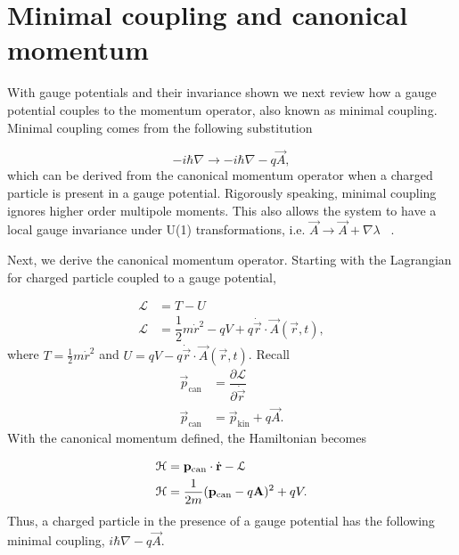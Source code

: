 \section{Minimal coupling and canonical momentum}
With gauge potentials and their invariance shown we next review how a gauge potential couples to the momentum operator, also known as minimal coupling.
Minimal coupling comes from the following substitution

\begin{equation}
  -i\hbar\nabla \rightarrow -i\hbar\nabla - q\vec{A},
\end{equation}
which can be derived from the canonical momentum operator when a charged particle is present in a gauge potential.
Rigorously speaking, minimal coupling ignores higher order multipole moments.
This also allows the system to have a local gauge invariance under U(1) transformations, i.e.
$\vec{A} \rightarrow \vec{A} + \nabla\lambda$  ~\cite{altlandCondensedMatterField2023}.

Next, we derive the canonical momentum operator.
Starting with the Lagrangian for charged particle coupled to a gauge potential,

\begin{align}
  \mathcal{L} &= T- U \nonumber \\
  \mathcal{L} &= \dfrac{1}{2} m \dot{r}^2 - qV + q \dot{\vec{r}} \cdot \vec{A}(\vec{r},t),
\end{align}
where $T = \tfrac{1}{2} m \dot{r}^2$ and $U = qV - q \dot{\vec{r}} \cdot \vec{A}(\vec{r},t)$.
Recall
\begin{align}
  \vec{p}_{\text{can}} &= \dfrac{\partial\mathcal{L}}{\partial \dot{\vec{r}}} \nonumber \\
  \vec{p}_{\text{can}} &= \vec{p}_{\text{kin}} + q \vec{A}.
  \label{eq:canonical-momentum}
\end{align}
With the canonical momentum defined, the Hamiltonian becomes

\begin{align}
  \mathcal{H} &= \mathbf{p}_{\text{can}} \cdot \dot{\mathbf{r}} - \mathcal{L} \nonumber \\
  \mathcal{H} &= \dfrac{1}{2m} (\mathbf{p}_{\text{can}} - q \mathbf{A})^2 + q V.
\end{align}
Thus, a charged particle in the presence of a gauge potential has the following minimal coupling,
$i\hbar\nabla - q\vec{A}$.

